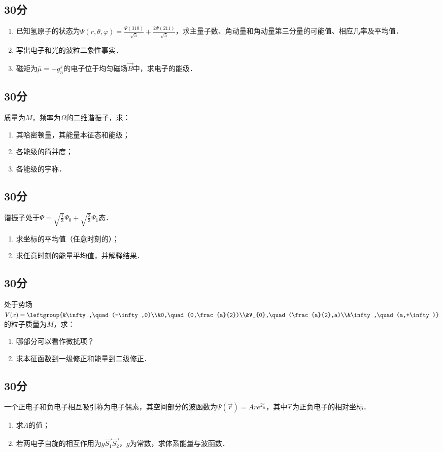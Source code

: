 
\subsection{30分}
\begin{enumerate}
\item 已知氢原子的状态为$\varPsi (r,\theta,\varphi)=\frac{\varPsi (310)}{\sqrt{5}}+\frac{2\varPsi (211)}{\sqrt{5}}$，求主量子数、角动量和角动量第三分量的可能值、相应几率及平均值．
\item 写出电子和光的波粒二象性事实．
\item 磁矩为$\bar{\mu}=-g^{\bar{s}}_{n}$的电子位于均匀磁场$\vec{B}$中，求电子的能级．
\end{enumerate}
\subsection{30分}
质量为$M$，频率为$\Omega$的二维谐振子，求：\\
\begin{enumerate}
\item 其哈密顿量，其能量本征态和能级；
\item 各能级的简并度；
\item 各能级的宇称．
\end{enumerate}
\subsection{30分}
谐振子处于$\varPsi =\sqrt{\frac{1}{3}}\varPsi_{0}+\sqrt{\frac{2}{3}}\varPsi_{1}$态．
\begin{enumerate}
\item 求坐标的平均值（任意时刻的）；
\item 求任意时刻的能量平均值，并解释结果．
\end{enumerate}
\subsection{30分}
处于势场$V(x)=\leftgroup{&\infty,\quad (-\infty,0)\\&0,\quad (0,\frac{a}{2})\\&V_{0},\quad (\frac{a}{2},a)\\&\infty,\quad (a,+\infty)}$的粒子质量为$M$，求：
\begin{enumerate}
\item 哪部分可以看作微扰项？
\item 求本征函数到一级修正和能量到二级修正．
\end{enumerate}
\subsection{30分}
一个正电子和负电子相互吸引称为电子偶素，其空间部分的波函数为$\varPsi (\vec{r})=Are^{2\frac{r}{a}}$，其中$\vec{r}$为正负电子的相对坐标．
\begin{enumerate}
\item 求$A$的值；
\item 若两电子自旋的相互作用为$g\vec{S_{1}}\vec{S_{2}}$，$g$为常数，求体系能量与波函数．
\end{enumerate}